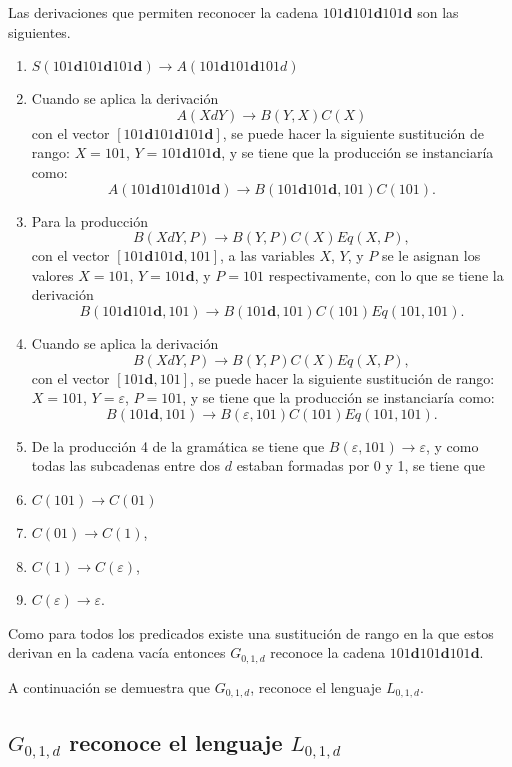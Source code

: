 Las derivaciones que permiten reconocer la cadena $101\mathbf{d}101\mathbf{d}101\mathbf{d}$ son las siguientes.


\begin{enumerate}
    \item $S(101\mathbf{d}101\mathbf{d}101\mathbf{d}) \to A(101\mathbf{d}101\mathbf{d}101d)$
    \item Cuando se aplica la derivación
          $$A(XdY)\to B(Y,X)C(X)$$
          con el vector  $[101\mathbf{d}101\mathbf{d}101\mathbf{d}]$, se puede hacer la siguiente sustitución de rango: $X=101$, $Y=101\mathbf{d}101\mathbf{d}$, y se tiene que la producción se instanciaría como:
          $$A(101\mathbf{d}101\mathbf{d}101\mathbf{d}) \to B(101\mathbf{d}101\mathbf{d},101)C(101).$$
    \item Para la producción $$B(XdY,P)\to B(Y,P) C(X) Eq(X,P),$$
          con el vector $[101\mathbf{d}101\mathbf{d},101]$, a las variables $X$, $Y$, y $P$ se le asignan los valores $X=101$, $Y=101\mathbf{d}$, y $P=101$ respectivamente, con lo que se tiene la derivación 
          $$B(101\mathbf{d}101\mathbf{d},101) \to B(101\mathbf{d},101)C(101)Eq(101,101).$$
    \item Cuando se aplica la derivación
          $$B(XdY,P)\to B(Y,P) C(X) Eq(X,P),$$
          con el vector $[101\mathbf{d},101]$, se puede hacer la siguiente sustitución de rango: $X=101$, $Y=\varepsilon$, $P=101$, y se tiene que la producción se instanciaría como:
          $$B(101\mathbf{d},101) \to B(\varepsilon,101)C(101)Eq(101,101).$$
    \item De la producción 4 de la gramática se tiene que $B(\varepsilon,101) \to \varepsilon$, y como todas las subcadenas entre dos $d$ estaban formadas por 0 y 1, se tiene que
    \item $C(101)\to C(01)$
    \item $C(01)\to C(1)$,
    \item $C(1)\to C(\varepsilon)$,
    \item $C(\varepsilon)\to \varepsilon$.
\end{enumerate}

Como para todos los predicados existe una sustitución de rango en la que estos derivan en la cadena vacía entonces  $G_{0,1,d}$ reconoce la cadena $101\mathbf{d}101\mathbf{d}101\mathbf{d}$.

A continuación se demuestra que $G_{0,1,d}$, reconoce el lenguaje $L_{0,1,d}$.

\subsection{$G_{0,1,d}$ reconoce el lenguaje $L_{0,1,d}$}
\label{sec:demg01d}

